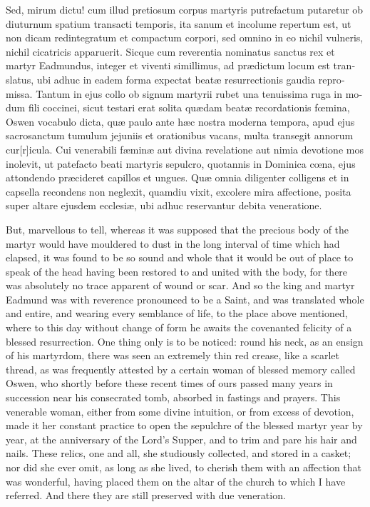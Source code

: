 \documentclass[10pt]{book}
\begin{document}
\begin{paracol}{2}
\begin{otherlanguage}{latin}
Sed, mirum dictu! cum illud pretiosum corpus martyris putrefactum putaretur ob diuturnum spatium transacti temporis, ita sanum et incolume repertum est, ut non dicam redintegratum et compactum corpori, sed omnino in eo nichil vulneris, nichil cicatricis apparuerit. Sicque cum reverentia nominatus sanctus rex et martyr Eadmundus, integer et viventi simillimus, ad pr\ae{}dictum locum est translatus, ubi adhuc in eadem forma expectat beat\ae{} resurrectionis gaudia repromissa. Tantum in ejus collo ob signum martyrii rubet una tenuissima ruga in modum fili coccinei, sicut testari erat solita qu\ae{}dam beat\ae{} recordationis f\oe{}mina, Oswen vocabulo dicta, qu\ae{} paulo ante h\ae{}c nostra moderna tempora, apud ejus sacrosanctum tumulum jejuniis et orationibus vacans, multa transegit annorum cur[r]icula. Cui venerabili f\ae{}min\ae{} aut divina revelatione aut nimia devotione mos inolevit, ut patefacto beati martyris sepulcro, quotannis in Dominica c\oe{}na, ejus attondendo pr\ae{}cideret capillos et ungues. Qu\ae{} omnia diligenter colligens et in capsella recondens non neglexit, quamdiu vixit, excolere mira affectione, posita super altare ejusdem ecclesi\ae{}, ubi adhuc reservantur debita veneratione.
\end{otherlanguage}

\switchcolumn

But, marvellous to tell, whereas it was supposed that the precious body of the martyr would have mouldered to dust in the long interval of time which had elapsed, it was found to be so sound and whole that it would be out of place to speak of the head having been restored to and united with the body, for there was absolutely no trace apparent of wound or scar. And so the king and martyr Eadmund was with reverence pronounced to be a Saint, and was translated whole and entire, and wearing every semblance of life, to the place above mentioned, where to this day without change of form he awaits the covenanted felicity of a blessed resurrection. One thing only is to be noticed: round his neck, as an ensign of his martyrdom, there was seen an extremely thin red crease, like a scarlet thread, as was frequently attested by a certain woman of blessed memory called Oswen, who shortly before these recent times of ours passed many years in succession near his consecrated tomb, absorbed in fastings and prayers. This venerable woman, either from some divine intuition, or from excess of devotion, made it her constant practice to open the sepulchre of the blessed martyr year by year, at the anniversary of the Lord's Supper, and to trim and pare his hair and nails. These relics, one and all, she studiously collected, and stored in a casket; nor did she ever omit, as long as she lived, to cherish them with an affection that was wonderful, having placed them on the altar of the church to which I have referred. And there they are still preserved with due veneration.


\end{paracol}
\end{document}

